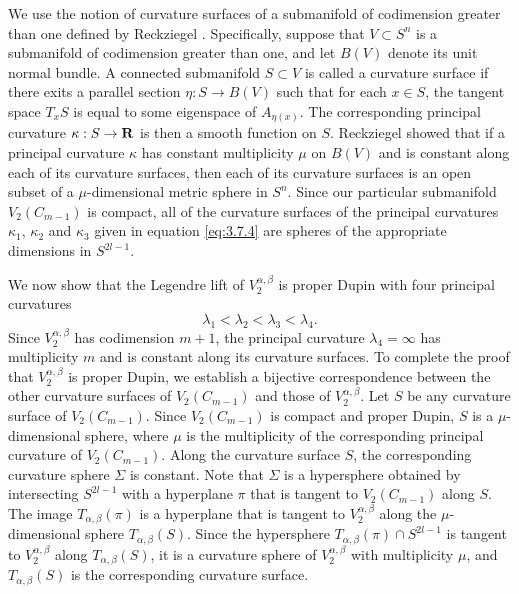 \documentclass[12pt]{article}
\begin{document}
We use the notion of curvature surfaces of a submanifold of codimension greater than one 
defined by Reckziegel \cite{Reck2}.
Specifically, suppose that $V \subset S^n$ is a submanifold of codimension greater than one, and let $B(V)$
denote its unit normal bundle. 
A connected submanifold $S \subset V$ is called a curvature surface if there exits a 
parallel section $\eta:S \rightarrow B(V)$ such that for each $x \in S$, 
the tangent space $T_xS$ is equal to some eigenspace of $A_{\eta (x)}$. The corresponding principal curvature
$\kappa :S \rightarrow {\bf R}$ is then a smooth function on $S$.  Reckziegel showed that if a principal curvature
$\kappa$ has constant multiplicity $\mu$ on $B(V)$ and is constant along each of its curvature surfaces,
then each of its curvature surfaces is an open subset of a $\mu$-dimensional metric sphere in $S^n$.
Since our particular submanifold $V_2 (C_{m-1})$ is compact, all of the curvature surfaces of 
the principal curvatures $\kappa_1$,
$\kappa_2$ and $\kappa_3$ given in equation \eqref{eq:3.7.4} are spheres of the appropriate dimensions in $S^{2l-1}$.

We now show that the Legendre lift of $V^{\alpha,\beta}_2$ is proper Dupin with four principal curvatures
\begin{equation}
\label{eq:Lie-curv-lambda}
\lambda_1 < \lambda_2 < \lambda_3 < \lambda_4.
\end{equation}
Since $V^{\alpha,\beta}_2$ has codimension $m+1$, the principal curvature $\lambda_4 = \infty$ has multiplicity $m$
and is constant along its curvature surfaces. To complete the proof that $V^{\alpha,\beta}_2$ is proper Dupin,
we establish a bijective correspondence between the other curvature surfaces of $V_2 (C_{m-1})$ and those of
$V^{\alpha,\beta}_2$.  Let $S$ be any curvature surface of $V_2 (C_{m-1})$.  Since $V_2 (C_{m-1})$ is compact
and proper Dupin, $S$ is a $\mu$-dimensional sphere, where $\mu$ is the multiplicity of the corresponding
principal curvature of $V_2 (C_{m-1})$.  Along the curvature surface $S$, the corresponding curvature sphere
$\Sigma$ is constant.  Note that $\Sigma$ is a hypersphere obtained by intersecting $S^{2l-1}$ with a hyperplane
$\pi$ that is tangent to $V_2 (C_{m-1})$ along $S$.  The image $T_{\alpha,\beta} (\pi)$ is a 
hyperplane that is tangent
to $V^{\alpha,\beta}_2$ along the $\mu$-dimensional sphere $T_{\alpha,\beta} (S)$.  Since the hypersphere
$T_{\alpha,\beta} (\pi) \cap S^{2l-1}$ is tangent to $V^{\alpha,\beta}_2$ along $T_{\alpha,\beta} (S)$, it is a curvature
sphere of $V^{\alpha,\beta}_2$ with multiplicity $\mu$, and $T_{\alpha,\beta} (S)$ is the corresponding curvature surface.
\end{document}
